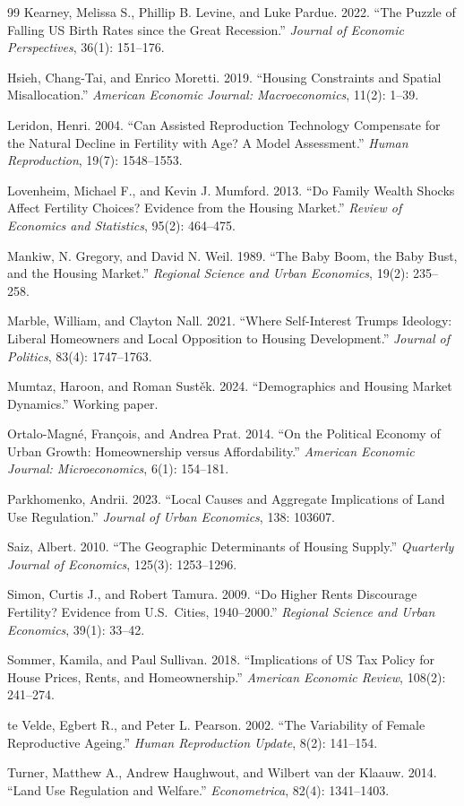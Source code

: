 \documentclass[11pt]{article}
\begin{document}
\begin{thebibliography}{99}
 Kearney, Melissa S., Phillip B. Levine, and Luke Pardue. 2022. ``The Puzzle of Falling US Birth Rates since the Great Recession.'' \textit{Journal of Economic Perspectives}, 36(1): 151--176.

 Hsieh, Chang-Tai, and Enrico Moretti. 2019. ``Housing Constraints and Spatial Misallocation.'' \textit{American Economic Journal: Macroeconomics}, 11(2): 1--39.

 Leridon, Henri. 2004. ``Can Assisted Reproduction Technology Compensate for the Natural Decline in Fertility with Age? A Model Assessment.'' \textit{Human Reproduction}, 19(7): 1548--1553.

 Lovenheim, Michael F., and Kevin J. Mumford. 2013. ``Do Family Wealth Shocks Affect Fertility Choices? Evidence from the Housing Market.'' \textit{Review of Economics and Statistics}, 95(2): 464--475.

 Mankiw, N. Gregory, and David N. Weil. 1989. ``The Baby Boom, the Baby Bust, and the Housing Market.'' \textit{Regional Science and Urban Economics}, 19(2): 235--258.

 Marble, William, and Clayton Nall. 2021. ``Where Self-Interest Trumps Ideology: Liberal Homeowners and Local Opposition to Housing Development.'' \textit{Journal of Politics}, 83(4): 1747--1763.

 Mumtaz, Haroon, and Roman Sust\v{e}k. 2024. ``Demographics and Housing Market Dynamics.'' Working paper.

 Ortalo-Magn\'{e}, Fran\c{c}ois, and Andrea Prat. 2014. ``On the Political Economy of Urban Growth: Homeownership versus Affordability.'' \textit{American Economic Journal: Microeconomics}, 6(1): 154--181.

 Parkhomenko, Andrii. 2023. ``Local Causes and Aggregate Implications of Land Use Regulation.'' \textit{Journal of Urban Economics}, 138: 103607.

 Saiz, Albert. 2010. ``The Geographic Determinants of Housing Supply.'' \textit{Quarterly Journal of Economics}, 125(3): 1253--1296.

 Simon, Curtis J., and Robert Tamura. 2009. ``Do Higher Rents Discourage Fertility? Evidence from U.S.\ Cities, 1940--2000.'' \textit{Regional Science and Urban Economics}, 39(1): 33--42.

 Sommer, Kamila, and Paul Sullivan. 2018. ``Implications of US Tax Policy for House Prices, Rents, and Homeownership.'' \textit{American Economic Review}, 108(2): 241--274.

 te Velde, Egbert R., and Peter L. Pearson. 2002. ``The Variability of Female Reproductive Ageing.'' \textit{Human Reproduction Update}, 8(2): 141--154.

 Turner, Matthew A., Andrew Haughwout, and Wilbert van der Klaauw. 2014. ``Land Use Regulation and Welfare.'' \textit{Econometrica}, 82(4): 1341--1403.

\end{thebibliography}
\end{document}
